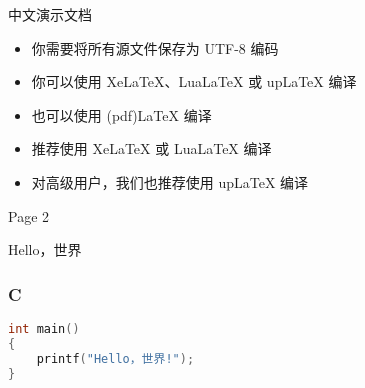 \documentclass{ctexbeamer}
\begin{document}
\begin{frame}{中文演示文档}
\begin{itemize}
	\item 你需要将所有源文件保存为 UTF-8 编码
	\item 你可以使用 XeLaTeX、LuaLaTeX 或 upLaTeX 编译
	\item 也可以使用 (pdf)LaTeX 编译
	\item 推荐使用 XeLaTeX 或 LuaLaTeX 编译
	\item 对高级用户，我们也推荐使用 upLaTeX 编译
\end{itemize}
\end{frame}

\begin{frame}{Page 2}

Hello，世界

\end{frame}


\begin{frame}[fragile]
\frametitle{C}


\begin{lstlisting}[language=c++]
int main()
{
	printf("Hello，世界!");
}
\end{lstlisting}


\end{frame}
\end{document}
